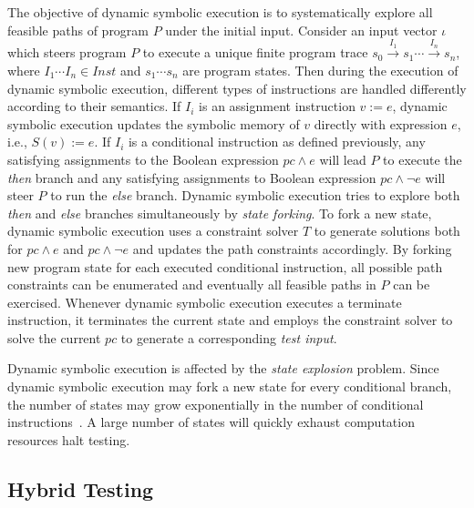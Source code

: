 The objective of dynamic symbolic execution is to systematically
explore all feasible paths of program $P$ under the initial input.
Consider an input vector $\iota$ which steers program $P$ to execute a
unique finite program trace
$s_0\xrightarrow{I_1}s_1\cdots\xrightarrow{I_n}s_n$, where $I_1\cdots
I_n\in Inst$ and $s_1\cdots s_n$ are program states. Then during the
execution of dynamic symbolic execution, different types of
instructions are handled differently according to their semantics. If
$I_i$ is an assignment instruction $v:=e$, dynamic symbolic execution
updates the symbolic memory of $v$ directly with expression $e$, i.e.,
$S(v):= e$. If $I_i$ is a conditional instruction as defined
previously, any satisfying assignments to the Boolean expression
$pc\wedge e$ will lead $P$ to execute the \textit{then} branch and any
satisfying assignments to Boolean expression $pc\wedge\neg e$ will
steer $P$ to run the \textit{else} branch. Dynamic symbolic execution
tries to explore both \textit{then} and \textit{else} branches
simultaneously by \textit{state forking}. To fork a new state, dynamic
symbolic execution uses a constraint solver $T$ to generate
solutions both for $pc\wedge e$ and $pc\wedge\neg e$ and updates the
path constraints accordingly. By forking new program state for each
executed conditional instruction, all possible path constraints can be
enumerated and eventually all feasible paths in $P$ can be exercised.
Whenever dynamic symbolic execution executes a terminate instruction,
it terminates the current state and employs the constraint solver to
solve the current $pc$ to generate a corresponding \textit{test input}.

Dynamic symbolic execution is affected by the \textit{state explosion}
problem. Since dynamic symbolic execution may fork a new state for
every conditional branch, the number of states may grow exponentially
in the number of conditional instructions~\cite{cadar2013symbolic}. A
large number of states will quickly exhaust computation resources halt
testing.



\subsection{Hybrid Testing}


